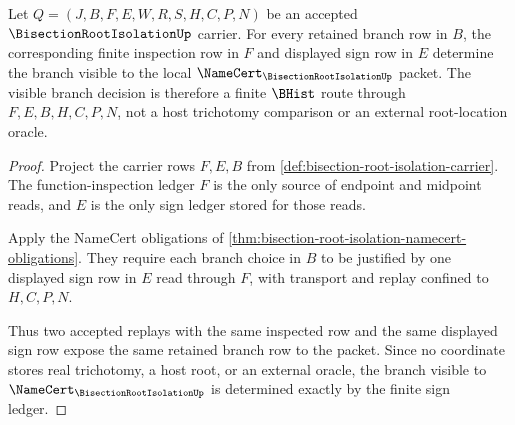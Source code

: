 \begin{theorem}
\label{thm:bisection-root-isolation-sign-ledger-determinacy}
Let $Q=(J,B,F,E,W,R,S,H,C,P,N)$ be an accepted $\BisectionRootIsolationUp$ carrier. For every retained branch row in $B$, the corresponding finite inspection row in $F$ and displayed sign row in $E$ determine the branch visible to the local $\NameCert_{\BisectionRootIsolationUp}$ packet. The visible branch decision is therefore a finite $\BHist$ route through $F,E,B,H,C,P,N$, not a host trichotomy comparison or an external root-location oracle.
\end{theorem}
\begin{proof}
Project the carrier rows $F,E,B$ from \autoref{def:bisection-root-isolation-carrier}. The function-inspection ledger $F$ is the only source of endpoint and midpoint reads, and $E$ is the only sign ledger stored for those reads.

Apply the NameCert obligations of \autoref{thm:bisection-root-isolation-namecert-obligations}. They require each branch choice in $B$ to be justified by one displayed sign row in $E$ read through $F$, with transport and replay confined to $H,C,P,N$.

Thus two accepted replays with the same inspected row and the same displayed sign row expose the same retained branch row to the packet. Since no coordinate stores real trichotomy, a host root, or an external oracle, the branch visible to $\NameCert_{\BisectionRootIsolationUp}$ is determined exactly by the finite sign ledger.
\end{proof}

